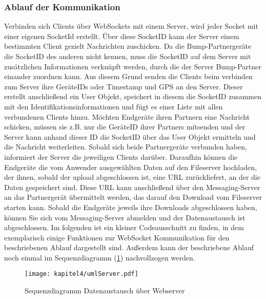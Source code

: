 \subsubsection{Ablauf der Kommunikation}
Verbinden sich Clients über WebSockets mit einem Server, wird jeder Socket mit einer eigenen SocketId erstellt. Über diese SocketID kann der Server einem bestimmten Client gezielt Nachrichten zuschicken. Da die Bump-Partnergeräte die SocketID des anderen nicht kennen, muss die SocketID auf dem Server mit zusätzlichen Informationen verknüpft werden, durch die der Server Bump-Partner einander zuordnen kann. Aus diesem Grund senden die Clients beim verbinden zum Server ihre GeräteIDs oder Timestamp und \acs{GPS} an den Server. Dieser erstellt anschließend ein User Objekt, speichert in diesem die SocketID zusammen mit den Identifikationsinformationen und fügt es einer Liste mit allen verbundenen Clients hinzu. Möchten Endgeräte ihren Partnern eine Nachricht schicken, müssen sie z.B. nur die GeräteID ihrer Partners mitsenden und der Server kann anhand dieser ID die SocketID über das User Objekt ermitteln und die Nachricht weiterleiten. Sobald sich beide Partnergeräte verbunden haben, informiert der Server die jeweiligen Clients darüber. Daraufhin können die Endgeräte die vom Anwender ausgewählten Daten auf den Fileserver hochladen, der ihnen, sobald der upload abgeschlossen ist, eine \acs{URL} zurückliefert, an der die Daten gespeichert sind. Diese \acs{URL} kann anschließend über den Messaging-Server an das Partnergerät übermittelt werden, das darauf den Download vom Fileserver starten kann. Sobald die Endgeräte jeweils ihre Downloads abgeschlossen haben, können Sie sich vom Messaging-Server abmelden und der Datenaustausch ist abgeschlossen. Im folgenden ist ein kleiner Codeausschnitt zu finden, in dem exemplarisch einige Funktionen zur WebSocket Kommunikation für den beschriebenen Ablauf dargestellt sind. Außerdem kann der beschriebene Ablauf noch einmal im Sequenzdiagramm (\ref{fig:sequenz}) nachvollzogen werden.



\begin{figure}[H]
    \centering
    \texttt{[image: kapitel4/umlServer.pdf]}
    \caption{Sequenzdiagramm Datenaustausch über Webserver}
    \label{fig:sequenz}
\end{figure}

\newpage
